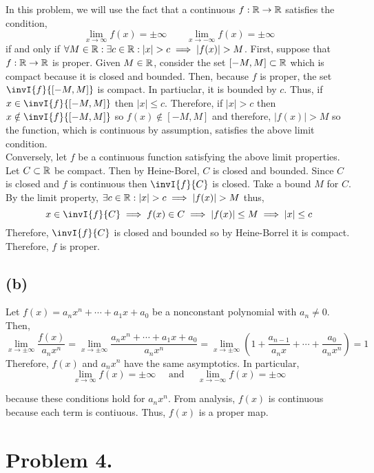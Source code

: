 \documentclass[12pt]{extarticle}
\begin{document}
In this problem, we will use the fact that a continuous $f : \mathbb{R} \to \mathbb{R}$ satisfies the condition,
\[ \lim_{x \to \infty} f(x) = \pm \infty \quad \quad \lim_{x \to -\infty} f(x) = \pm \infty \] 
if and only if $\forall M \in \mathbb{R} : \exists c \in \mathbb{R} : |x| > c \implies |f(x)| > M$. First, suppose that $f : \mathbb{R} \to \mathbb{R}$ is proper. Given $M \in \mathbb{R}$, consider the set $[-M, M] \subset \mathbb{R}$ which is compact because it is closed and bounded. Then, because $f$ is proper, the set $\invI{f}{[-M, M]}$ is compact. In partiuclar, it is bounded by $c$. Thus, if $x \in \invI{f}{[-M, M]}$ then $|x| \le c$. Therefore, if $|x| > c$ then $x \notin \invI{f}{[-M,M]}$ so $f(x) \notin [-M, M]$ and therefore, $|f(x)| > M$ so the function, which is continuous by assumption, satisfies the above limit condition. \bigskip \\
Conversely, let $f$ be a continuous function satisfying the above limit properties. Let $C \subset \mathbb{R}$ be compact. Then by Heine-Borel, $C$ is closed and bounded. Since $C$ is closed and $f$ is continuous then $\invI{f}{C}$ is closed. Take a bound $M$ for $C$. By the limit property, $\exists c \in \mathbb{R} : |x| > c \implies |f(x)| > M$ thus,
\[x \in \invI{f}{C} \implies f(x) \in C \implies |f(x)| \le M \implies |x| \le c\]
Therefore, $\invI{f}{C}$ is closed and bounded so by Heine-Borrel it is compact. Therefore, $f$ is proper.        

\subsection*{(b)}

Let $f(x) = a_n x^n + \cdots + a_1 x + a_0$ be a nonconstant polynomial with $a_n \neq 0$. Then, 
\[ \lim_{x \to \pm \infty} \frac{f(x)}{a_n x^n} = \lim_{x \to \pm \infty} \frac{a_n x^n + \cdots + a_1 x + a_0}{a_n x^n} = \lim_{x \to \pm \infty} \left(1 + \frac{a_{n-1}}{a_n x} + \cdots + \frac{a_0}{a_n x^n} \right) = 1 \]
Therefore, $f(x)$ and $a_n x^n$ have the same asymptotics. In particular, 
\[\lim_{x \to \infty} f(x) = \pm \infty \quad \text{ and } \quad \lim_{x \to - \infty} f(x) = \pm \infty\]

because these conditions hold for $a_n x^n$. From analysis, $f(x)$ is continuous because each term is contiuous. Thus, $f(x)$ is a proper map. 

\section*{Problem 4.}
              
\end{document}
